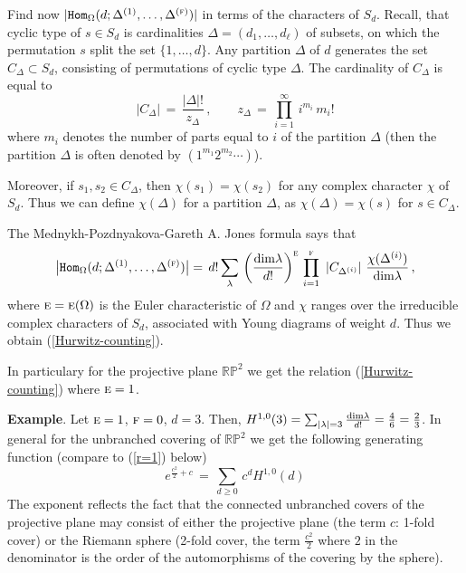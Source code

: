 \documentclass[a4paper,10pt]{article}
\theoremstyle{plain}
\theoremstyle{remark}
\def\be{\begin{equation}}
\def\ee{\end{equation}}
\begin{document}
\vspace{2ex}

Find now $|\texttt{Hom}_\Omega(d;\Delta^{(1)},\dots,\Delta^{(\textsc{f})})|$ in terms of the characters of $S_d$. Recall, that
cyclic type  of $s\in S_d$ is cardinalities $\Delta=(d_1,\dots,d_{\ell})$ of subsets, on which the permutation $s$ split
the set $\{1,\dots,d\}$. Any partition $\Delta$ of $d$ generates the set $C_{\Delta}\subset S_d$,  consisting of permutations
of cyclic type $\Delta$. The cardinality of $C_\Delta$ is equal to
\be\label{C-Delta,z-Delta}
|C_\Delta| \,=\,\frac{|\Delta|!}{z_\Delta}\,,\qquad
z_\Delta\,=\,\prod_{i=1}^\infty \,i^{m_i}\,m_i!
\ee
where $m_i$ denotes the number of parts equal to $i$ of the partition $\Delta$ (then the partition $\Delta$ is often
denoted by $(1^{m_1}2^{m_2}\cdots)$).

Moreover, if $s_1,s_2\in C_{\Delta}$, then $\chi(s_1)=\chi(s_2)$ for any complex character $\chi$ of $S_d$. Thus we can
define $\chi(\Delta)$ for a partition $\Delta$, as $\chi(\Delta)=\chi(s)$ for $s\in C_\Delta$.

The Mednykh-Pozdnyakova-Gareth A. Jones formula \cite{M1,M2,ZL,GARETH.A.JONES} says that
\[ \big|\texttt{Hom}_\Omega(d;\Delta^{(1)},\dots, \Delta^{(\textsc{f})})\big| = \,
d!\sum_{\lambda} \,
\left(\frac{{\rm dim}\lambda}{d!}\right)^{\textsc{e}}\,
\prod_{i=1}^\textsc{f} \,\,|C_{\Delta^{(i)}}|\,\,
\frac{\chi(\Delta^{(i)})}
{{\rm dim}\lambda} \,,
\]
where $\textsc{e}=\textsc{e}(\Omega)$ is the Euler characteristic of $\Omega$ and $\chi$ ranges over the irreducible
complex characters of
$S_d$, associated with Young diagrams of weight $d$. Thus we obtain (\ref{Hurwitz-counting}).

In particulary for the projective plane $\mathbb{RP}^2$ we get the relation (\ref{Hurwitz-counting}) where
$\textsc{e}=1$.


\vspace{1ex}

{\bf Example}. Let $\textsc{e}=1$, $\textsc{f}=0$, $d=3$.
Then, $ H^{1,0}(3) = \sum_{|\lambda|=3}
\frac{{\rm dim}\lambda}{d!}=\frac{4}{6}=\frac{2}{3}$.
In general for the unbranched covering  of $\mathbb{RP}^2$ we get the following generating function
(compare to (\ref{r=1}) below)
\be\label{unbranched}
e^{\frac {c^2}{2} + c}\,=\,\sum_{d\ge 0}\, c^d H^{1,0}(d)
\ee
The exponent reflects the fact that the connected unbranched covers of the projective plane may consist of either
the projective plane (the term $c$: 1-fold cover) or the Riemann sphere (2-fold cover, the term $\frac{c^2}{2}$ where $2$ in the
denominator is the order of the automorphisms of the covering by the sphere).
\end{document}
